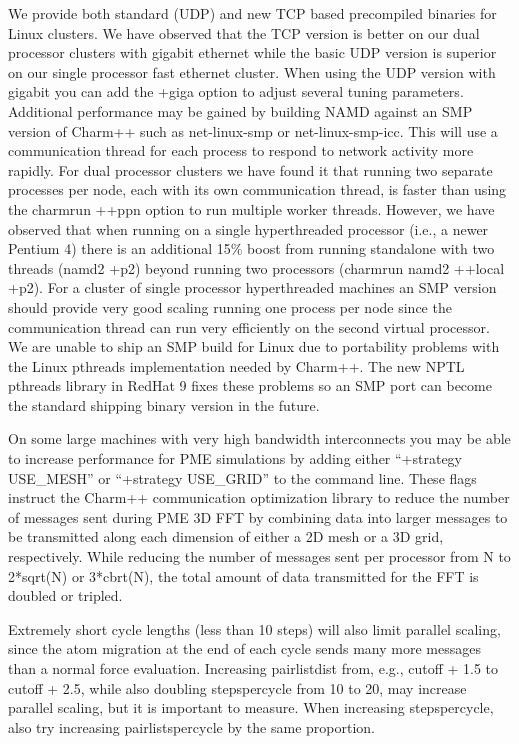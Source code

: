 We provide both standard (UDP) and new TCP based precompiled binaries
for Linux clusters.  We have observed that the TCP version is better
on our dual processor clusters with gigabit ethernet while the basic
UDP version is superior on our single processor fast ethernet cluster.
When using the UDP version with gigabit you can add the +giga option
to adjust several tuning parameters.  Additional performance may be
gained by building NAMD against an SMP version of Charm++ such as
net-linux-smp or net-linux-smp-icc.  This will use a communication
thread for each process to respond to network activity more rapidly.
For dual processor clusters we have found it that running two separate
processes per node, each with its own communication thread, is faster
than using the charmrun ++ppn option to run multiple worker threads.
However, we have observed that when running on a single hyperthreaded
processor (i.e., a newer Pentium 4) there is an additional 15\% boost
from running standalone with two threads (namd2 +p2) beyond running
two processors (charmrun namd2 ++local +p2).  For a cluster of single
processor hyperthreaded machines an SMP version should provide very
good scaling running one process per node since the communication
thread can run very efficiently on the second virtual processor.  We
are unable to ship an SMP build for Linux due to portability problems
with the Linux pthreads implementation needed by Charm++.  The new
NPTL pthreads library in RedHat 9 fixes these problems so an SMP port
can become the standard shipping binary version in the future.

On some large machines with very high bandwidth interconnects you may
be able to increase performance for PME simulations by adding either
``+strategy USE\_MESH'' or ``+strategy USE\_GRID'' to the command line.
These flags instruct the Charm++ communication optimization library to
reduce the number of messages sent during PME 3D FFT by combining data
into larger messages to be transmitted along each dimension of either
a 2D mesh or a 3D grid, respectively.  While reducing the number of
messages sent per processor from N to 2*sqrt(N) or 3*cbrt(N), the
total amount of data transmitted for the FFT is doubled or tripled.

Extremely short cycle lengths (less than 10 steps) will also limit
parallel scaling, since the atom migration at the end of each cycle
sends many more messages than a normal force evaluation.  Increasing
pairlistdist from, e.g., cutoff + 1.5 to cutoff + 2.5, while also
doubling stepspercycle from 10 to 20, may increase parallel scaling,
but it is important to measure.  When increasing stepspercycle, also
try increasing pairlistspercycle by the same proportion.

